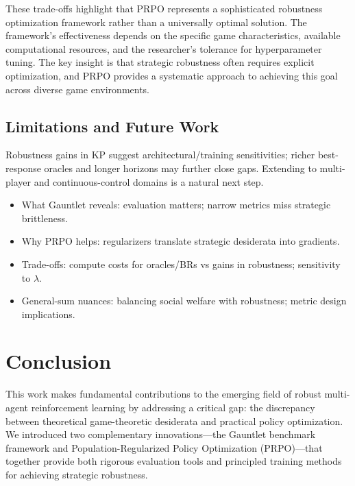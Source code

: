 \documentclass[sigconf,anonymous]{aamas}
\begin{document}
These trade-offs highlight that PRPO represents a sophisticated robustness optimization framework rather than a universally optimal solution. The framework's effectiveness depends on the specific game characteristics, available computational resources, and the researcher's tolerance for hyperparameter tuning. The key insight is that strategic robustness often requires explicit optimization, and PRPO provides a systematic approach to achieving this goal across diverse game environments.

\subsection{Limitations and Future Work}
Robustness gains in KP suggest architectural/training sensitivities; richer best-response oracles and longer horizons may further close gaps. Extending to multi-player and continuous-control domains is a natural next step.
\begin{itemize}
\item What Gauntlet reveals: evaluation matters; narrow metrics miss strategic brittleness.
\item Why PRPO helps: regularizers translate strategic desiderata into gradients.
\item Trade-offs: compute costs for oracles/BRs vs gains in robustness; sensitivity to \(\lambda\).
\item General-sum nuances: balancing social welfare with robustness; metric design implications.
\end{itemize}



\section{Conclusion}

This work makes fundamental contributions to the emerging field of robust multi-agent reinforcement learning by addressing a critical gap: the discrepancy between theoretical game-theoretic desiderata and practical policy optimization. We introduced two complementary innovations—the Gauntlet benchmark framework and Population-Regularized Policy Optimization (PRPO)—that together provide both rigorous evaluation tools and principled training methods for achieving strategic robustness.
\end{document}

